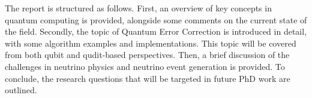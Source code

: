 The report is structured as follows. First, an overview of key concepts in quantum computing is provided, alongside some comments on the current state of the field. Secondly, the topic of Quantum Error Correction is introduced in detail, with some algorithm examples and implementations. This topic will be covered from both qubit and qudit-based perspectives. Then, a brief discussion of the challenges in neutrino physics and neutrino event generation is provided. To conclude, the research questions that will be targeted in future PhD work are outlined.






